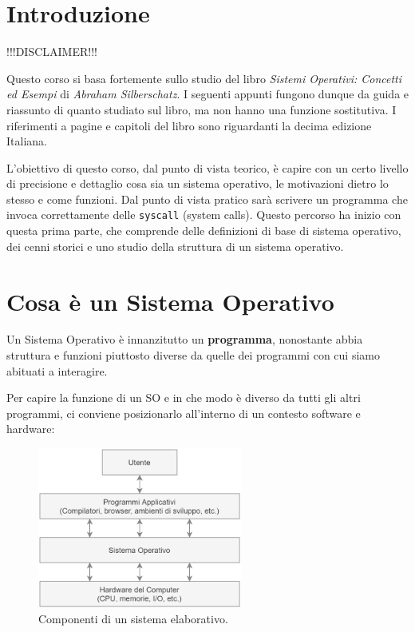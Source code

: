 \section{Introduzione}
    \begin{center}
        \Large\color{red}!!!DISCLAIMER!!!
    \end{center}
    Questo corso si basa fortemente sullo studio del libro \textit{Sistemi Operativi: Concetti ed Esempi} di \textit{Abraham Silberschatz}. I seguenti appunti fungono dunque da guida e riassunto di quanto studiato sul libro, ma non hanno una funzione sostitutiva. I riferimenti a pagine e capitoli del libro sono riguardanti la decima edizione Italiana.
    
    L'obiettivo di questo corso, dal punto di vista teorico, è capire con un certo livello di precisione e dettaglio cosa sia un sistema operativo, le motivazioni dietro lo stesso e come funzioni. Dal punto di vista pratico sarà scrivere un programma che invoca correttamente delle \texttt{syscall} (system calls). Questo percorso ha inizio con questa prima parte, che comprende delle definizioni di base di sistema operativo, dei cenni storici e uno studio della struttura di un sistema operativo.
    
\section{Cosa è un Sistema Operativo}
    Un Sistema Operativo è innanzitutto un \textbf{programma}, nonostante abbia struttura e funzioni piuttosto diverse da quelle dei programmi con cui siamo abituati a interagire.
    
    Per capire la funzione di un SO e in che modo è diverso da tutti gli altri programmi, ci conviene posizionarlo all'interno di un contesto software e hardware:
    
    \begin{figure}[h]
        \centering
        \includegraphics[width=0.6\textwidth]{img/img1.png}
        \caption{Componenti di un sistema elaborativo.}
        \label{fig:img1}
    \end{figure}
    
